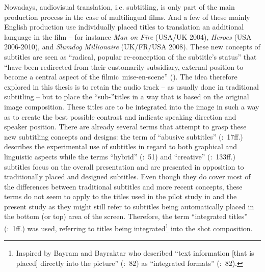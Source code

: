 \largerpage
Nowadays, audiovisual translation, i.e. subtitling, is only part of the main production process in the case of multilingual films. And a few of these mainly English production use individually placed titles to translation an additional language in the film – for instance \textit{Man on Fire} (USA/UK 2004), \textit{Heroes} (USA 2006-2010), and \textit{Slumdog Millionaire} (UK/FR/USA 2008). These new concepts of subtitles are seen as “radical, popular re-conception of the subtitle's status” \citep{Kofoed2011} that “have been redirected from their customarily subsidiary, external position to become a central aspect of the filmic~mise-en-scene” (\citealt{Kofoed2011}). The idea therefore explored in this thesis is to retain the audio track – as usually done in traditional subtitling – but to place the “sub-”titles in a way that is based on the original image composition. These titles are to be integrated into the image in such a way as to create the best possible contrast and indicate speaking direction and speaker position. There are already several terms that attempt to grasp these new subtitling concepts and designs: the term of “abusive subtitles” (\citealt{nornes1999}:~17ff.) describes the experimental use of subtitles in regard to both graphical and linguistic aspects while the terms “hybrid” (\citealt{Diaz_cintas2006}:~51) and “creative” (\citealt{mcclarty2012}:~133ff.) subtitles focus on the overall presentation and are presented in opposition to traditionally placed and designed subtitles. Even though they do cover most of the differences between traditional subtitles and more recent concepts, these terms do not seem to apply to the titles used in the pilot study in \citet{Fox2012} and the present study as they might still refer to subtitles being automatically placed in the bottom (or top) area of the screen. Therefore, the term “integrated titles” (\citealt{Fox2012}:~1ff.) was used, referring to titles being integrated\footnote{Inspired by Bayram and Bayraktar who described “text information [that is placed] directly into the picture” (\citeyear{Bayram2012}:~82) as “integrated formats” (\citeyear{Bayram2012}:~82).} into the shot composition.
